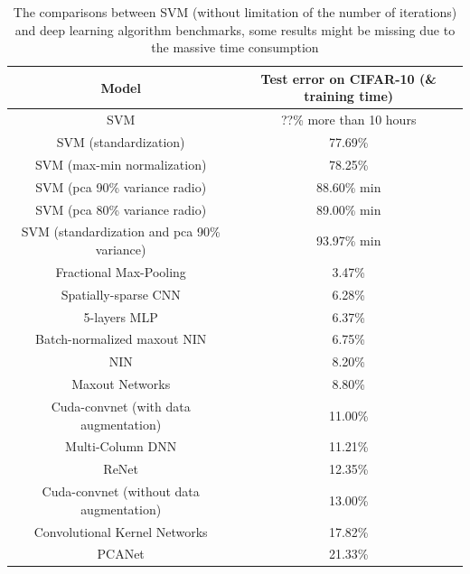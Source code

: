 \documentclass[12pt,a4paper]{article}
\theoremstyle{definition}
\begin{document}
\vspace{-0.015\linewidth}
\begin{table}[H]
	\renewcommand\arraystretch{1.25}
	\caption{The comparisons between SVM (without limitation of the number of iterations) and deep learning algorithm benchmarks, some results might be missing due to the massive time consumption}
	\label{tab:res}
	\centering
	
	\begin{tabular}{c|c}
		\centering
		Model & Test error on CIFAR-10 (\& training time) \\
		\hline
		\hline
		
		SVM & ??\% \quad more than 10 hours \\
		SVM (standardization) & 77.69\% \quad \\
		SVM (max-min normalization) & 78.25\% \quad \\
		SVM (pca 90\% variance radio) & 88.60\% \quad 21 min \\
		SVM (pca 80\% variance radio) & 89.00\% \quad 5 min \\
		SVM (standardization and pca 90\% variance) & 93.97\% \quad 16 min\\
		\hline
		Fractional Max-Pooling \cite{bench2} & 3.47\% \\
		Spatially-sparse CNN \cite{bench10} & 6.28\% \\
		5-layers MLP & 6.37\% \\
		Batch-normalized maxout NIN \cite{bench3} & 6.75\% \\
		NIN \cite{bench4} & 8.20\% \\
		Maxout Networks \cite{bench5} & 8.80\% \\
		Cuda-convnet \cite{bench1} (with data augmentation) & 11.00\% \\
		Multi-Column DNN \cite{bench6} & 11.21\% \\
		ReNet \cite{bench9} & 12.35\% \\
		Cuda-convnet (without data augmentation) & 13.00\% \\
		Convolutional Kernel Networks \cite{bench7} & 17.82\% \\
		PCANet \cite{bench8} & 21.33\% \\
	\end{tabular}
\end{table}
\end{document}

